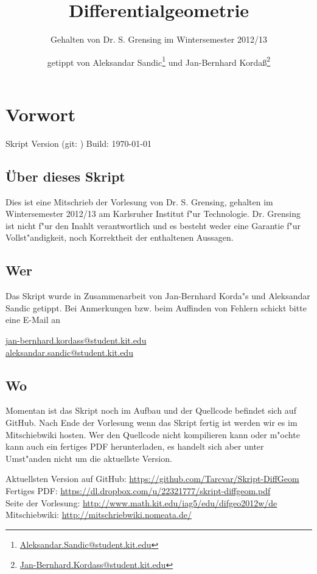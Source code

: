 \documentclass[paper=A4, twoside, chapterprefix=true, bibliography=totoc, headsepline]{scrbook}
\title{Differentialgeometrie}
\subtitle{Gehalten von Dr. S. Grensing im Wintersemester 2012/13}
\author{getippt von Aleksandar Sandic\thanks{\href{mailto:aleksandar.sandic@student.kit.edu}{Aleksandar.Sandic@student.kit.edu}} und Jan-Bernhard Korda\ss\thanks{\href{mailto:jan-bernhard.kordass@student.kit.edu}{Jan-Bernhard.Kordass@student.kit.edu}}}
\begin{document}
\maketitle

\setlength\parskip{0.6pt}
\tableofcontents

\chapter*{Vorwort}
\setlength\parskip{\smallskipamount} Skript Version \textbf{\GITVersionTag}
(git: \GITAbrHash) \quad Build: \today

\section*{\"Uber dieses Skript}
Dies ist eine Mitschrieb der Vorlesung  von Dr. S. Grensing, gehalten im Wintersemester 2012/13 am Karlsruher Institut f"ur Technologie.
Dr. Grensing ist nicht f"ur den Inahlt verantwortlich und es besteht weder eine Garantie f"ur Vollst"andigkeit, noch Korrektheit der enthaltenen Aussagen.

\section*{Wer}
Das Skript wurde in Zusammenarbeit von Jan-Bernhard Korda"s und Aleksandar Sandic getippt.
Bei Anmerkungen bzw. beim Auffinden von Fehlern schickt bitte eine E-Mail an
\begin{center}
  \href{mailto:jan-bernhard.kordass@student.kit.edu}{jan-bernhard.kordass@student.kit.edu}\\
  \href{mailto:aleksandar.sandic@student.kit.edu}{aleksandar.sandic@student.kit.edu}
\end{center}

\section*{Wo}
Momentan ist das Skript noch im Aufbau und der Quellcode befindet sich auf GitHub.
Nach Ende der Vorlesung wenn das Skript fertig ist werden wir es im Mitschiebwiki hosten.
Wer den Quellcode nicht kompilieren kann oder m"ochte kann auch ein fertiges PDF herunterladen, es handelt sich aber unter Umst"anden nicht um die aktuellste Version.

Aktuellsten Version auf GitHub: \url{https://github.com/Tarcvar/Skript-DiffGeom}\\
Fertiges PDF: \url{https://dl.dropbox.com/u/22321777/skript-diffgeom.pdf}\\
Seite der Vorlesung: \url{http://www.math.kit.edu/iag5/edu/difgeo2012w/de}\\
Mitschiebwiki: \url{http://mitschriebwiki.nomeata.de/}
\end{document}
